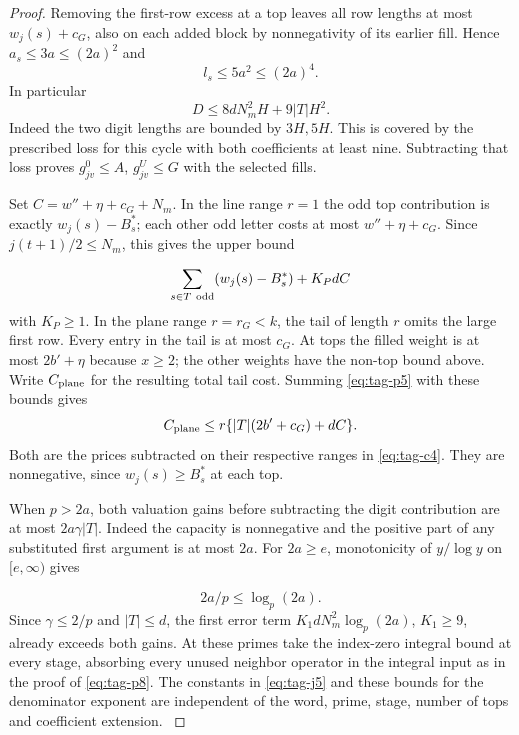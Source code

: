 \begin{proof}
Removing the first-row excess at a top
leaves all row lengths at most \(w_j(s)+c_G\), also on each
added block by nonnegativity of its earlier fill. Hence
\(a_s\le 3a\le(2a)^2\) and 
\[
  l_s\le5a^2\le(2a)^4.
\]
In particular
\[
              D\le 8dN_m^2H+9|T|H^2 .                            \tag{J5}\label{eq:tag-j5}
\]
Indeed the two digit lengths are bounded by \(3H,5H\). This
is covered by the prescribed loss for this cycle with both coefficients
at least nine. Subtracting that loss proves
\(g^0_{jv}\le A\), \(g^U_{jv}\le G\) with the selected fills.


Set \(C=w''+\eta+c_G+N_m\). In the line range \(r=1\)
the odd top contribution is exactly \(w_j(s)-B_s^*\);
each other odd letter costs at most \(w''+\eta+c_G\).
Since \(j(t+1)/2\le N_m\), this gives the upper bound

\[
  \sum_{s\in T\ {\rm odd}}(w_j(s)-B_s^*)+K_Pd C
\]
 with
\(K_P\ge1\). In the plane range \(r=r_G<k\), the tail of
length \(r\) omits the large first row. Every entry in the
tail is at most \(c_G\). At tops the filled weight is at most
\(2b'+\eta\) because \(x\ge2\); the other weights have the
non-top bound above. Write \(C_{\rm plane}\) for the resulting total tail cost. Summing \eqref{eq:tag-p5} with these bounds gives
\[
  C_{\rm plane}\le r\{|T|(2b'+c_G)+d C\}.
\]
 Both are the prices subtracted on
their respective ranges in \eqref{eq:tag-c4}. They are nonnegative, since
\(w_j(s)\ge B_s^*\) at each top.


When \(p>2a\), both valuation gains before subtracting the digit contribution are at most \(2a\gamma |T|\). Indeed the capacity is
nonnegative and the positive part of any substituted first
argument is at most \(2a\). For \(2a\ge e\), monotonicity of
\(y/\log y\) on \([e,\infty)\) gives

\[
  2a/p\le\log_p(2a).
\]
 Since \(\gamma\le2/p\) and
\(|T|\le d\), the first error term
\(K_1dN_m^2\log_p(2a)\), \(K_1\ge9\), already exceeds
both gains. At these primes take the index-zero integral bound
at every stage, absorbing every unused neighbor operator in the
integral input as in the proof of \eqref{eq:tag-p8}. The constants in \eqref{eq:tag-j5} and
these bounds for the denominator exponent are independent of the word, prime, stage,
number of tops and coefficient extension.
\label{cor:hecke-entry-capacities-2}
\end{proof}
